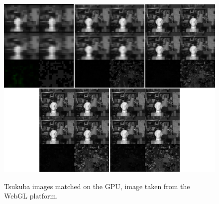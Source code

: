 \begin{figure}[ht!]
\begin{center}
\includegraphics[width=12cm]{fig/matching1-result}\\
\caption{Tsukuba images matched on the GPU, image taken from the WebGL platform.}
\label{fig_matching1-result}
\end{center}
\end{figure}
